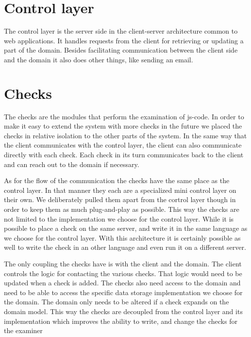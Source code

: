 \section{Control layer}
The control layer is the server side
in the client-server architecture common to web applications.
It handles requests from the client
for retrieving or updating a part of the domain.
Besides facilitating communication between the client side and the domain
it also does other things, like sending an email.

\section{Checks}
The checks are the modules that perform the examination of \gls{js-code}.
In order to make it easy to extend the system with more checks in the future
we placed the checks in relative isolation to the other parts of the system.
In the same way that the client communicates with the control layer,
the client can also communicate directly with each check.
Each check in its turn communicates back to the client
and can reach out to the domain if necessary.

As for the flow of the communication
the checks have the same place as the control layer.
In that manner they each are a specialized mini control layer on their own.
We deliberately pulled them apart from the cortrol layer though
in order to keep them as much plug-and-play as possible.
This way the checks are not limited
to the implementation we choose for the control layer.
While it is possible to place a check on the same server,
and write it in the same language as we choose for the control layer.
With this architecture it is certainly possible as well
to write the check in an other language
and even run it on a different server.

The only coupling the checks have is with the client and the domain.
The client controls the logic for contacting the various checks.
That logic would need to be updated when a check is added.
The checks also need access to the domain
and need to be able to access
the specific data storage implementation we choose for the domain.
The domain only needs to be altered if a check expands on the domain model.
This way the checks are decoupled from the control layer
and its implementation
which improves the ability to write,
and change the checks for the \gls{examiner}

